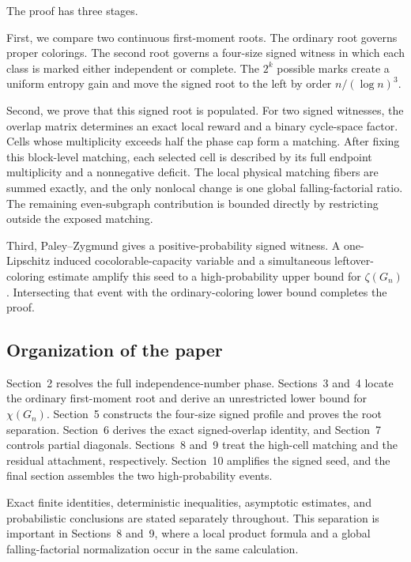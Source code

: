 The proof has three stages.

First, we compare two continuous first-moment roots.  The ordinary root governs
proper colorings.  The second root governs a four-size signed witness in which
each class is marked either independent or complete.  The $2^k$ possible marks
create a uniform entropy gain and move the signed root to the left by order
$n/(\log n)^3$.

Second, we prove that this signed root is populated.  For two signed witnesses,
the overlap matrix determines an exact local reward and a binary cycle-space
factor.  Cells whose multiplicity exceeds half the phase cap form a matching.
After fixing this block-level matching, each selected cell is described by its
full endpoint multiplicity and a nonnegative deficit.  The local physical
matching fibers are summed exactly, and the only nonlocal change is one global
falling-factorial ratio.  The remaining even-subgraph contribution is bounded
directly by restricting outside the exposed matching.

Third, Paley--Zygmund gives a positive-probability signed witness.  A
one-Lipschitz induced cocolorable-capacity variable and a simultaneous
leftover-coloring estimate amplify this seed to a high-probability upper bound
for $\zeta(G_n)$.  Intersecting that event with the ordinary-coloring lower
bound completes the proof.

\subsection{Organization of the paper}

Section~2 resolves the full independence-number phase.  Sections~3 and~4
locate the ordinary first-moment root and derive an unrestricted lower bound
for $\chi(G_n)$.  Section~5 constructs the four-size signed profile and proves
the root separation.  Section~6 derives the exact signed-overlap identity, and
Section~7 controls partial diagonals.  Sections~8 and~9 treat the high-cell
matching and the residual attachment, respectively.  Section~10 amplifies the
signed seed, and the final section assembles the two high-probability events.

Exact finite identities, deterministic inequalities, asymptotic estimates, and
probabilistic conclusions are stated separately throughout.  This separation
is important in Sections~8 and~9, where a local product formula and a global
falling-factorial normalization occur in the same calculation.
